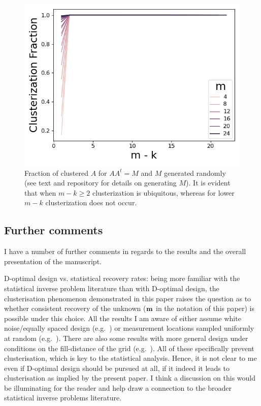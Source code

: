\begin{figure}
    \centering
    \includegraphics[height=0.5\textwidth]{../latex/figs/simulations.png}
    \caption{Fraction of clustered $A$ for $AA^t = M$ and $M$
      generated randomly (see text and repository for details on
      generating $M$). It is evident that when $m-k \geq 2$ clusterization
      is ubiquitous, whereas for lower $m-k$ clusterization does not
      occur.}
  \label{fig:sim_AAt}
\end{figure}

\subsection{Further comments}
\RC I have a number of further comments in regards to the results and the
overall presentation of the manuscript.


\RC D-optimal design vs. statistical recovery rates: being more
familiar with the statistical inverse problem literature than with
D-optimal design, the clusterisation phenomenon demonstrated in this
paper raises the question as to whether consistent recovery of the
unknown ($\mathbf{m}$ in the notation of this paper) is possible under
this choice. All the results I am aware of either assume white
noise/equally spaced design (e.g.~\cite{knapik2011}) or measurement
locations sampled uniformly at random (e.g.~\cite{nickl2023}). There
are also some results with more general design under conditions on the
fill-distance of the grid (e.g.~\cite{teckentrup2020}). All of these
specifically prevent clusterisation, which is key to the statistical
analysis. Hence, it is not clear to me even if D-optimal design should
be pursued at all, if it indeed it leads to clusterisation as implied
by the present paper. I think a discussion on this would be
illuminating for the reader and help draw a connection to the broader
statistical inverse problems literature.

